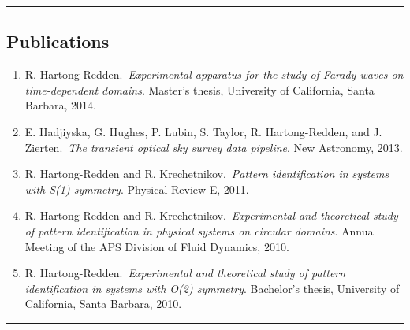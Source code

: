 \documentclass[10pt,letterpaper]{article}
\newenvironment{indentsection}[1]%
{\begin{list}{}%
	{\setlength{\leftmargin}{#1}}%
	\item[]%
}
{\end{list}}
\begin{document}
\hrule
\subsection*{Publications}
\begin{indentsection}{\parindent}
\begin{enumerate}
	\item R. Hartong-Redden.~\emph{Experimental apparatus for the study of Farady waves on time-dependent domains}. Master's thesis, University of California, Santa Barbara, 2014.
	\item E. Hadjiyska, G. Hughes, P. Lubin, S. Taylor, R. Hartong-Redden, and J. Zierten.~\emph{The transient optical sky survey data pipeline}. New Astronomy, 2013.
	\item R. Hartong-Redden and R. Krechetnikov.~{\em Pattern identification in systems with S(1) symmetry}. Physical Review E, 2011.
	\item R. Hartong-Redden and R. Krechetnikov.~{\em Experimental and theoretical study of pattern identification in physical systems on circular domains}. Annual Meeting of the APS Division of Fluid Dynamics, 2010.
	\item R. Hartong-Redden.~{\em Experimental and theoretical study of pattern identification in systems with O(2) symmetry}. Bachelor's thesis, University of California, Santa Barbara, 2010.
\end{enumerate}
\end{indentsection}
\hrule
\end{document}
